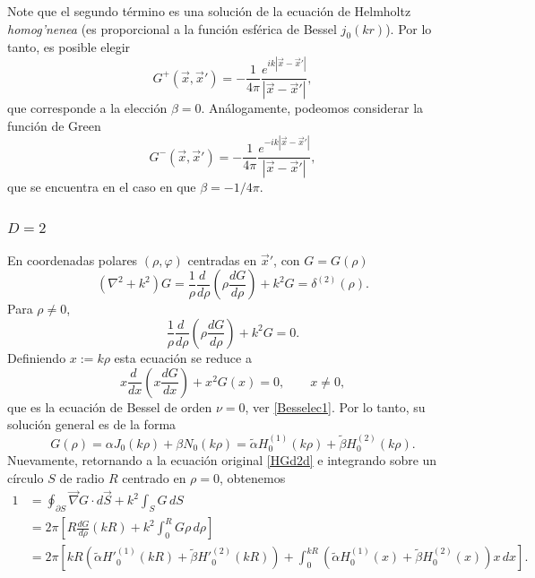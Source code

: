 Note que el segundo término es una solución de la ecuación de Helmholtz \textit{homog'nenea} (es proporcional a la función esférica de Bessel $j_0(kr)$). Por lo tanto, es posible elegir
\begin{equation}\label{GH3d3}
\boxed{G^{+}(\vec{x},\vec{x}')=-\frac{1}{4\pi}\frac{e^{ik|\vec{x}-\vec{x}'|}}{|\vec{x}-\vec{x}'|},}
\end{equation}
que corresponde a la elección $\beta=0$. Análogamente, podeomos considerar la función de Green 
\begin{equation}\label{GH3d4}
G^{-}(\vec{x},\vec{x}')=-\frac{1}{4\pi}\frac{e^{-ik|\vec{x}-\vec{x}'|}}{|\vec{x}-\vec{x}'|},
\end{equation}
que se encuentra en el caso en que $\beta=-1/4\pi$.

\subsubsection{$D=2$}
En coordenadas polares $(\rho,\varphi)$ centradas en $\vec{x}'$, con $G=G(\rho)$
\begin{equation}\label{HGd2d}
(\nabla^2+k^2)G=\frac{1}{\rho}\frac{d\ }{d\rho}\left(\rho\frac{dG}{d\rho}\right)+k^2G=\delta^{(2)}(\rho).
\end{equation}
Para $\rho\neq 0$, 
\begin{equation}
\frac{1}{\rho}\frac{d\ }{d\rho}\left(\rho\frac{dG}{d\rho}\right)+k^2G=0.
\end{equation}
Definiendo $x:=k\rho$ esta ecuación se reduce a
\begin{equation}
x\frac{d\ }{dx}\left(x\frac{dG}{dx}\right)+x^2G(x)=0, \qquad x\neq 0,
\end{equation}
que es la ecuación de Bessel de orden $\nu=0$, ver \eqref{Besselec1}. Por lo tanto, su solución general es de la forma
\begin{equation}
G(\rho)=\alpha J_0(k\rho)+\beta N_0(k\rho)=\tilde\alpha H^{(1)}_0(k\rho)+\tilde\beta H^{(2)}_0(k\rho).
\end{equation}
Nuevamente, retornando a la ecuación original \eqref{HGd2d} e integrando sobre un círculo $S$ de radio $R$ centrado en $\rho=0$, obtenemos
\begin{align}
1 &= \oint_{\partial S}\vec\nabla G\cdot d\vec{S}+k^2\int_S G\,dS \\
&= 2\pi\left[R\frac{dG}{d\rho}(kR)+k^2\int_0^RG\rho\,d\rho\right] \\
&= 2\pi\left[kR\left(\tilde\alpha H'^{(1)}_0(kR)+\tilde\beta H'^{(2)}_0(kR)\right)+\int_0^{kR}\left(\tilde\alpha H^{(1)}_0(x)+\tilde\beta H^{(2)}_0(x)\right)x\,dx\right].
\end{align}
